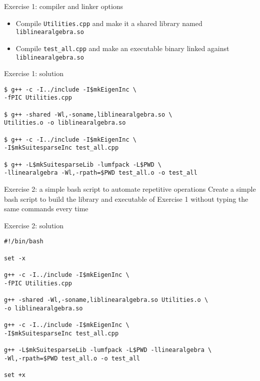 \documentclass[10pt]{beamer}
\begin{document}
\begin{frame}{Exercise 1: compiler and linker options}
\begin{itemize}
\item Compile {\tt Utilities.cpp} and make it a shared library named {\tt liblinearalgebra.so}\\[5mm]
\item Compile {\tt test\_all.cpp} and make an executable binary linked against {\tt liblinearalgebra.so}
\end{itemize}
\end{frame}

\begin{frame}[fragile]{Exercise 1: solution}
\begin{verbatim}
$ g++ -c -I../include -I$mkEigenInc \
-fPIC Utilities.cpp

$ g++ -shared -Wl,-soname,liblinearalgebra.so \
Utilities.o -o liblinearalgebra.so

$ g++ -c -I../include -I$mkEigenInc \
-I$mkSuitesparseInc test_all.cpp

$ g++ -L$mkSuitesparseLib -lumfpack -L$PWD \
-llinearalgebra -Wl,-rpath=$PWD test_all.o -o test_all

\end{verbatim}


\end{frame}



\begin{frame}{Exercise 2: a simple bash script to automate repetitive operations}
Create a simple bash script to build the library and executable of Exercise 1 without typing the same commands every time
\end{frame}

\begin{frame}[fragile]{Exercise 2: solution}
\begin{verbatim}
#!/bin/bash

set -x

g++ -c -I../include -I$mkEigenInc \
-fPIC Utilities.cpp

g++ -shared -Wl,-soname,liblinearalgebra.so Utilities.o \
-o liblinearalgebra.so

g++ -c -I../include -I$mkEigenInc \
-I$mkSuitesparseInc test_all.cpp

g++ -L$mkSuitesparseLib -lumfpack -L$PWD -llinearalgebra \
-Wl,-rpath=$PWD test_all.o -o test_all

set +x
\end{verbatim}
\end{frame}
\end{document}
